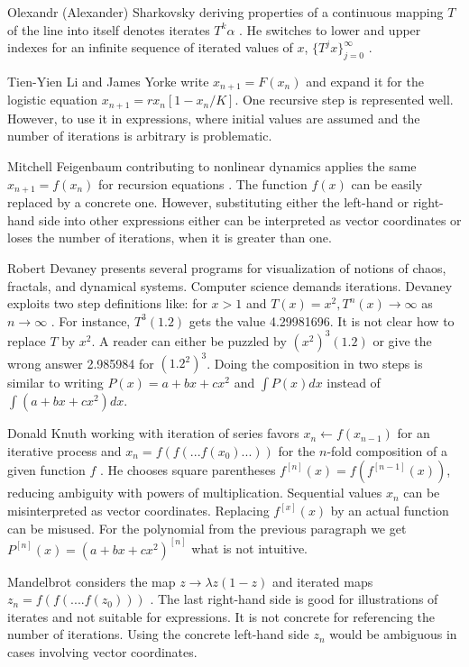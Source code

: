 \documentclass{article}
\begin{document}
Olexandr (Alexander) Sharkovsky deriving properties of a continuous mapping $T$ of the line into itself denotes iterates $T^k{\alpha}$ \cite{sharkovsky1}. He switches to lower and upper indexes for an infinite sequence of iterated values of $x$, $\{T^j{x}\}_{j = 0}^\infty$ \cite{sharkovsky2}.

Tien-Yien Li and James Yorke \cite{li} write $x_{n + 1} = F(x_n)$ and expand it for the logistic equation $x_{n + 1} = rx_n[1 - x_n/K]$. One recursive step is represented well. However, to use it in expressions, where initial values are assumed and the number of iterations is arbitrary is problematic.

Mitchell Feigenbaum contributing to nonlinear dynamics applies the same $x_{n+1} = f(x_n)$ for recursion equations \cite{feigenbaum}. The function $f(x)$ can be easily replaced by a concrete one. However, substituting either the left-hand or right-hand side into other expressions either can be interpreted as vector coordinates or loses the number of iterations, when it is greater than one.

Robert Devaney presents several programs for visualization of notions of chaos, fractals, and dynamical systems. Computer science demands iterations. Devaney exploits two step definitions like: for $x > 1$ and $T(x) = x^2, T^n(x) \to \infty$ as $n \to \infty$ \cite[p. 12]{devaney}. For instance, $T^{3}(1.2)$ gets the value 4.29981696. It is not clear how to replace $T$ by $x^2$. A reader can  either be puzzled by $(x^2)^3(1.2)$ or give the wrong answer 2.985984 for $(1.2^2)^3$. Doing the composition in two steps is similar to writing $P(x) = a + bx + cx^2$ and $\int{P(x)dx}$ instead of $\int{(a + bx + cx^2)dx}$.

Donald Knuth working with iteration of series favors $x_n \gets f(x_{n - 1})$ for an iterative process and $x_n = f(f(...f(x_0)...))$ for the $n$-fold composition of a given function $f$ \cite[p. 530]{knuth}. He chooses square parentheses $f^{[n]}(x) = f(f^{[n - 1]}(x))$, reducing ambiguity with powers of multiplication. Sequential values $x_n$ can be misinterpreted as vector coordinates. Replacing $f^{[x]}(x)$ by an actual function can be misused. For the polynomial from the previous paragraph we get $P^{[n]}(x) = (a + bx + cx^2)^{[n]}$ what is not intuitive.

Mandelbrot considers the map $z \to \lambda z(1 - z)$ and iterated maps $z_n = f(f(....f(z_0)))$ \cite[p. 38]{mandelbrot}. The last right-hand side is good for illustrations of iterates and not suitable for expressions. It is not concrete for referencing the number of iterations. Using the concrete left-hand side $z_n$ would be ambiguous in cases involving vector coordinates.
\end{document}
